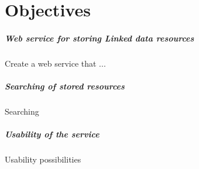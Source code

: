 \chapter{Objectives}

\paragraph{Web service for storing Linked data resources}
Create a web service that ...

\paragraph{Searching of stored resources}
Searching

\paragraph{Usability of the service}
Usability possibilities
